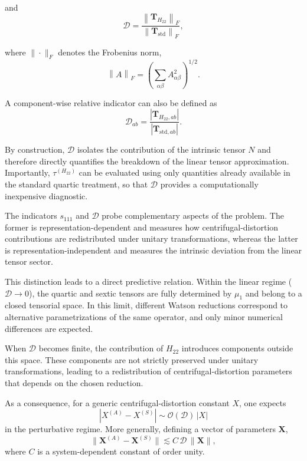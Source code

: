 \documentclass[aip,jcp,reprint,floatfix]{revtex4-2}
\begin{document}
and
\begin{equation}
\mathcal{D}
=
\frac{
\left\| \mathbf T_{H_{22}} \right\|_F
}{
\left\| \mathbf T_{\mathrm{std}} \right\|_F
},
\end{equation}

where $\|\cdot\|_F$ denotes the Frobenius norm,
\begin{equation}
\left\| A \right\|_F =
\left(
\sum_{\alpha\beta}
A_{\alpha\beta}^2
\right)^{1/2}.
\end{equation}

A component-wise relative indicator can also be defined as
\begin{equation}
\mathcal{D}_{ab}
=
\frac{
\left| \mathbf T_{H_{22},ab} \right|
}{
\left| \mathbf T_{\mathrm{std},ab} \right|
}.
\end{equation}

By construction, $\mathcal{D}$ isolates the contribution of the
intrinsic tensor $N$ and therefore directly quantifies the breakdown
of the linear tensor approximation. Importantly, $\tau^{(H_{22})}$ can
be evaluated using only quantities already available in the standard
quartic treatment, so that $\mathcal{D}$ provides a computationally
inexpensive diagnostic.

The indicators $s_{111}$ and $\mathcal{D}$ probe complementary aspects
of the problem. The former is representation-dependent and measures
how centrifugal-distortion contributions are redistributed under
unitary transformations, whereas the latter is representation-independent
and measures the intrinsic deviation from the linear tensor sector.

This distinction leads to a direct predictive relation. Within the
linear regime ($\mathcal{D} \to 0$), the quartic and sextic tensors are
fully determined by $\mu_1$ and belong to a closed tensorial space. In
this limit, different Watson reductions correspond to alternative
parametrizations of the same operator, and only minor numerical
differences are expected.

When $\mathcal{D}$ becomes finite, the contribution of $H_{22}$ introduces
components outside this space. These components are not strictly
preserved under unitary transformations, leading to a redistribution of
centrifugal-distortion parameters that depends on the chosen reduction.

As a consequence, for a generic centrifugal-distortion constant $X$, one
expects
\begin{equation}
|X^{(A)} - X^{(S)}|
\sim
\mathcal{O}(\mathcal{D}) \, |X|
\end{equation}
in the perturbative regime. More generally, defining a vector of
parameters $\mathbf{X}$,
\begin{equation}
\|\mathbf{X}^{(A)} - \mathbf{X}^{(S)}\|
\lesssim
C \, \mathcal{D} \, \|\mathbf{X}\|,
\end{equation}
where $C$ is a system-dependent constant of order unity.
\end{document}
